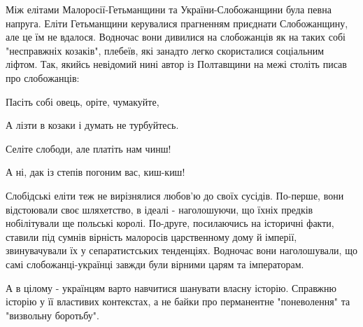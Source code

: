 Між елітами Малоросії-Гетьманщини та України-Слобожанщини була певна напруга.
Еліти Гетьманщини керувалися прагненням приєднати Слобожанщину, але це їм не
вдалося. Водночас вони дивилися на слобожанців як на таких собі "несправжніх
козаків", плебеїв, які занадто легко скористалися соціальним ліфтом. Так,
якийсь невідомий нині автор із Полтавщини на межі століть писав про
слобожанців:

Пасіть собі овець, оріте, чумакуйте,

А лізти в козаки і думать не турбуйтесь.

Селіте слободи, але платіть нам чинш!

А ні, дак із степів погоним вас, киш-киш!

Слобідські еліти теж не вирізнялися любов'ю до своїх сусідів. По-перше, вони
відстоювали своє шляхетство, в ідеалі - наголошуючи, що їхніх предків
нобілітували ще польські королі. По-друге, посилаючись на історичні факти,
ставили під сумнів вірність малоросів царственному дому й імперії,
звинувачували їх у сепаратистських тенденціях. Водночас вони наголошували, що
самі слобожанці-українці завжди були вірними царям та імператорам.

А в цілому - українцям варто навчитися шанувати власну історію. Справжню
історію у її властивих контекстах, а не байки про перманентне "поневолення" та
"визвольну боротьбу".

